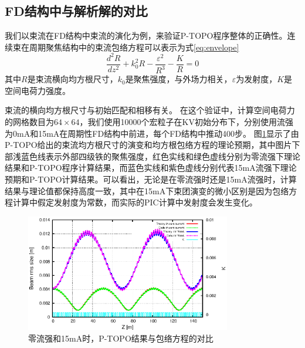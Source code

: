 \subsection{FD结构中与解析解的对比}
我们以束流在FD结构中束流的演化为例，来验证P-TOPO程序整体的正确性。连续束在周期聚焦结构中的束流包络方程可以表示为式\ref{eq:envelope}\cite{wangler1998particle,chen1994nonlinear}
\begin{equation}\label{eq:envelope}
  \frac{{{d}^{2}}R}{d{{z}^{2}}}+k_{0}^{2}R-\frac{{{\varepsilon }^{2}}}{{{R}^{3}}}-\frac{K}{R}=0
\end{equation}
其中$R$是束流横向均方根尺寸，$k_0$是聚焦强度，与外场力相关，$\varepsilon$为发射度，$K$是空间电荷力强度。

束流的横向均方根尺寸与初始匹配和相移有关。
在这个验证中，计算空间电荷力的网格数目为$64 \times 64$，我们使用10000个宏粒子在KV初始分布下，分别使用流强为0mA和15mA在周期性FD结构中前进，每个FD结构中推动400步。
图\ref{fig:P_TOPO_verification2}显示了由P-TOPO给出的束流均方根尺寸的演变和均方根包络方程的理论预期，其中图片下部浅蓝色线表示外部四级铁的聚焦强度，红色实线和绿色虚线分别为零流强下理论结果和P-TOPO程序计算结果，而蓝色实线和紫色虚线分别代表15mA流强下理论预期和P-TOPO计算结果。可以看出，无论是在零流强时还是15mA流强时，计算结果与理论值都保持高度一致，其中在15mA下束团演变的微小区别是因为包络方程计算中假定发射度为常数，而实际的PIC计算中发射度会发生变化。

\begin{figure}[!htb]
    \centering
    \includegraphics[width=0.8\textwidth]{Img/P_TOPO_verification2.eps}
    \caption{零流强和15mA时，P-TOPO结果与包络方程的对比}
    \label{fig:P_TOPO_verification2}
\end{figure}



